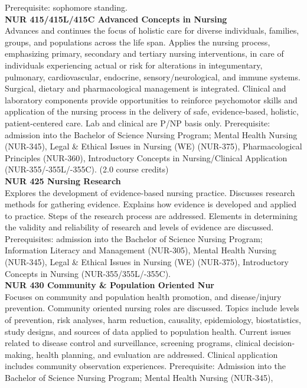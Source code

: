 \documentclass[
  letterpaper,
]{scrbook}
\begin{document}
Prerequisite: sophomore standing.\\
\textbf{NUR 415/415L/415C Advanced Concepts in Nursing}\\
Advances and continues the focus of holistic care for diverse
individuals, families, groups, and populations across the life span.
Applies the nursing process, emphasizing primary, secondary and tertiary
nursing interventions, in care of individuals experiencing actual or
risk for alterations in integumentary, pulmonary, cardiovascular,
endocrine, sensory/neurological, and immune systems. Surgical, dietary
and pharmacological management is integrated. Clinical and laboratory
components provide opportunities to reinforce psychomotor skills and
application of the nursing process in the delivery of safe,
evidence-based, holistic, patient-centered care. Lab and clinical are
P/NP basis only. Prerequisite: admission into the Bachelor of Science
Nursing Program; Mental Health Nursing (NUR-345), Legal \& Ethical
Issues in Nursing (WE) (NUR-375), Pharmacological Principles (NUR-360),
Introductory Concepts in Nursing/Clinical Application
(NUR-355/-355L/-355C). (2.0 course credits)\\
\textbf{NUR 425 Nursing Research}\\
Explores the development of evidence-based nursing practice. Discusses
research methods for gathering evidence. Explains how evidence is
developed and applied to practice. Steps of the research process are
addressed. Elements in determining the validity and reliability of
research and levels of evidence are discussed. Prerequisites: admission
into the Bachelor of Science Nursing Program; Information Literacy and
Management (NUR-305), Mental Health Nursing (NUR-345), Legal \& Ethical
Issues in Nursing (WE) (NUR-375), Introductory Concepts in Nursing
(NUR-355/355L/-355C).\\
\textbf{NUR 430 Community \& Population Oriented Nur}\\
Focuses on community and population health promotion, and disease/injury
prevention. Community oriented nursing roles are discussed. Topics
include levels of prevention, risk analyses, harm reduction, causality,
epidemiology, biostatistics, study designs, and sources of data applied
to population health. Current issues related to disease control and
surveillance, screening programs, clinical decision-making, health
planning, and evaluation are addressed. Clinical application includes
community observation experiences. Prerequisite: Admission into the
Bachelor of Science Nursing Program; Mental Health Nursing (NUR-345),
\end{document}
